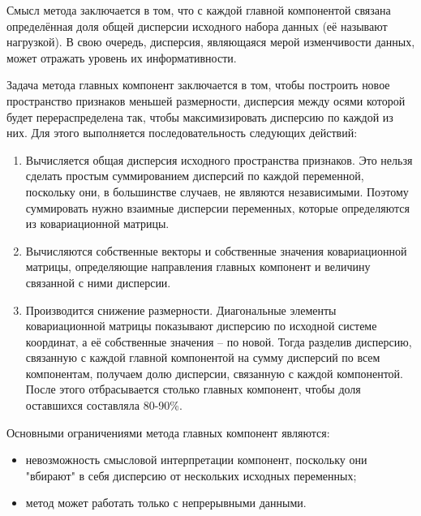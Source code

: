 \documentclass[a4paper, 12pt]{article}
\begin{document}
Смысл метода заключается в том, что с каждой главной компонентой связана определённая доля общей дисперсии исходного набора данных (её называют нагрузкой). В свою очередь, дисперсия, являющаяся мерой изменчивости данных, может отражать уровень их информативности.

Задача метода главных компонент заключается в том, чтобы построить новое пространство признаков меньшей размерности, дисперсия между осями которой будет перераспределена так, чтобы максимизировать дисперсию по каждой из них. Для этого выполняется последовательность следующих действий:
\begin{enumerate}
    \item Вычисляется общая дисперсия исходного пространства признаков. Это нельзя сделать простым суммированием дисперсий по каждой переменной, поскольку они, в большинстве случаев, не являются независимыми. Поэтому суммировать нужно взаимные дисперсии переменных, которые определяются из ковариационной матрицы.
    \item Вычисляются собственные векторы и собственные значения ковариационной матрицы, определяющие направления главных компонент и величину связанной с ними дисперсии.
    \item Производится снижение размерности. Диагональные элементы ковариационной матрицы показывают дисперсию по исходной системе координат, а её собственные значения -- по новой. Тогда разделив дисперсию, связанную с каждой главной компонентой на сумму дисперсий по всем компонентам, получаем долю дисперсии, связанную с каждой компонентой. После этого отбрасывается столько главных компонент, чтобы доля оставшихся составляла 80-90\%.
\end{enumerate}

Основными ограничениями метода главных компонент являются:
\begin{itemize}
    \item невозможность смысловой интерпретации компонент, поскольку они "вбирают" в себя дисперсию от нескольких исходных переменных;
    \item метод может работать только с непрерывными данными.
\end{itemize}
\end{document}

